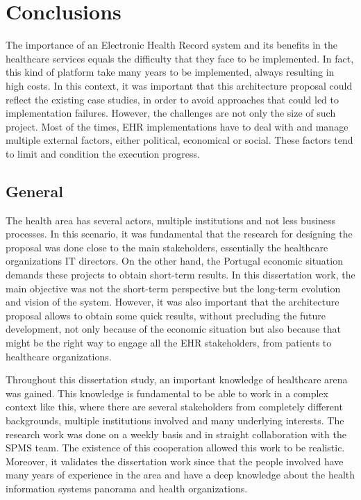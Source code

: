 \chapter{Conclusions} \label{chap:concl}

%


The importance of an Electronic Health Record system and its benefits in the healthcare services equals the difficulty that they face to be implemented. In fact, this kind of platform take many years to be implemented, always resulting in high costs. In this context, it was important that this architecture proposal could reflect the existing case studies, in order to avoid approaches that could led to implementation failures. However, the challenges are not only the size of such project. Most of the times, EHR implementations have to deal with and manage multiple external factors, either political, economical or social. These factors tend to limit and condition the execution progress.


\section{General}

The health area has several actors, multiple institutions and not less business processes. In this scenario, it was fundamental that the research for designing the proposal was done close to the main stakeholders, essentially the healthcare organizations IT directors. On the other hand, the Portugal economic situation demands these projects to obtain short-term results. In this dissertation work, the main objective was not the short-term perspective but the long-term evolution and vision of the system. However, it was also important that the architecture proposal allows to obtain some quick results, without precluding the future development, not only because of the economic situation but also because that might be the right way to engage all the EHR stakeholders, from patients to healthcare organizations.

Throughout this dissertation study, an important knowledge of healthcare arena was gained. This knowledge is fundamental to be able to work in a complex context like this, where there are several stakeholders from completely different backgrounds, multiple institutions involved and many underlying interests. The research work was done on a weekly basis and in straight collaboration with the SPMS team. The existence of this cooperation allowed this work to be realistic. Moreover, it validates the dissertation work since that the people involved have many years of experience in the area and have a deep knowledge about the health information systems panorama and health organizations.

